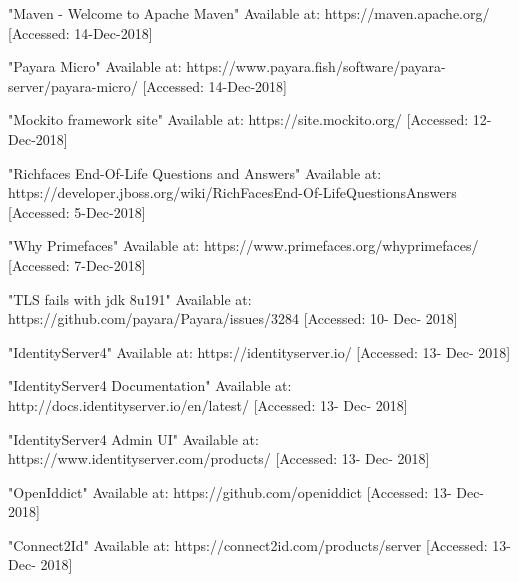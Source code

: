  "Maven - Welcome to Apache Maven"
Available at: https://maven.apache.org/ [Accessed: 14-Dec-2018]

 "Payara Micro"
Available at: https://www.payara.fish/software/payara-server/payara-micro/ [Accessed: 14-Dec-2018]

 "Mockito framework site"
Available at: https://site.mockito.org/ [Accessed: 12-Dec-2018]

 "Richfaces End-Of-Life Questions and Answers"
Available at: https://developer.jboss.org/wiki/RichFacesEnd-Of-LifeQuestionsAnswers [Accessed: 5-Dec-2018]

 "Why Primefaces"
Available at: https://www.primefaces.org/whyprimefaces/ [Accessed: 7-Dec-2018]

 "TLS fails with jdk 8u191" Available at: https://github.com/payara/Payara/issues/3284 [Accessed: 10- Dec- 2018]

 "IdentityServer4" Available at: https://identityserver.io/ [Accessed: 13- Dec- 2018]

 "IdentityServer4 Documentation" Available at: http://docs.identityserver.io/en/latest/ [Accessed: 13- Dec- 2018]

 "IdentityServer4 Admin UI" Available at: https://www.identityserver.com/products/ [Accessed: 13- Dec- 2018]

 "OpenIddict" Available at: https://github.com/openiddict [Accessed: 13- Dec- 2018]

 "Connect2Id" Available at: https://connect2id.com/products/server [Accessed: 13- Dec- 2018]
